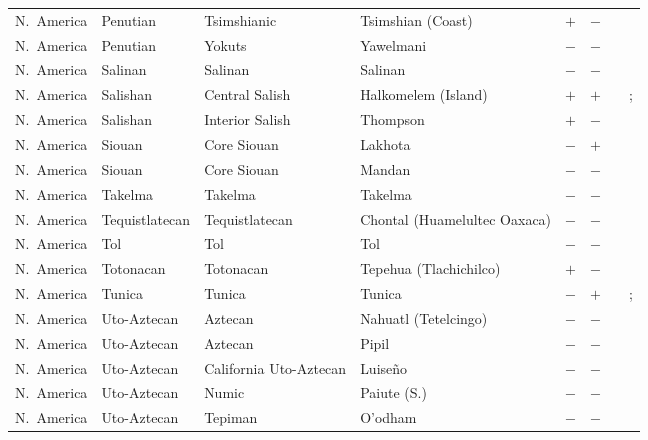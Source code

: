 \begin{landscape}
\begin{longtable}{l>{\raggedright\arraybackslash}p{2.2cm}>{\raggedright}p{2.5cm}>{\raggedright\arraybackslash}p{2.5cm}cc>{\raggedright\arraybackslash}p{3.4cm}>{\raggedright\arraybackslash}p{3.4cm}}
N.~America & Penutian & Tsimshianic & Tsimshian (Coast) & $+$ & $-$ & \citealt{Gil2013} & \citealt{Corbett2013}\\
N.~America & Penutian & Yokuts & Yawelmani & $-$ & $-$ & \citealt{Gil2013} & \citealt[299]{Nichols1992}\\
N.~America & Salinan & Salinan & Salinan & $-$ & $-$ & \citealt{Gil2013} & \citealt[299]{Nichols1992}\\
N.~America & Salishan & Central Salish & Halkomelem (Island) & $+$ & $+$ & \citealt[254--266]{Gerdts2004} & \citealt[417--418]{Gerdts2013}; \citealt[176--177]{Gerdts2010}\\
N.~America & Salishan & Interior Salish & Thompson & $+$ & $-$ & \citealt{Gil2013} & \citealt{Corbett2013}\\
N.~America & Siouan & Core Siouan & Lakhota & $-$ & $+$ & \citealt{Gil2013} & \citealt[36--37]{Valin1977}\\
N.~America & Siouan & Core Siouan & Mandan & $-$ & $-$ & \citealt{Gil2013} & \citealt[passim]{Kennard1936}\\
N.~America & Takelma & Takelma & Takelma & $-$ & $-$ & \citealt{Gil2013} & \citealt[299]{Nichols1992}\\
N.~America & Tequistlatecan & Tequistlatecan & Chontal (Huamelultec Oaxaca) & $-$ & $-$ & \citealt[301]{Nichols1992} & \citealt[356--358]{Waterhouse1967}\\
N.~America & Tol & Tol & Tol & $-$ & $-$ & \citealt{Gil2013} & \citealt{Corbett2013}\\
N.~America & Totonacan & Totonacan & Tepehua (Tlachichilco) & $+$ & $-$ & \citealt[301]{Nichols1992} & \citealt[301]{Nichols1992}\\
N.~America & Tunica & Tunica & Tunica & $-$ & $+$ & \citealt{Gil2013} & \citealt{Corbett2013}; \citealt[36--38, 62, 64--65, 102--110]{Haas1940}\\
N.~America & Uto-Aztecan & Aztecan & Nahuatl (Tetelcingo) & $-$ & $-$ & \citealt{Gil2013} & \citealt{Corbett2013}\\
N.~America & Uto-Aztecan & Aztecan & Pipil & $-$ & $-$ & \citealt{Gil2013} & \citealt{Corbett2013}\\
N.~America & Uto-Aztecan & California Uto-Aztecan & Luiseño & $-$ & $-$ & \citealt{Gil2013} & \citealt[23--28]{Elliott1999}\\
N.~America & Uto-Aztecan & Numic & Paiute (S.) & $-$ & $-$ & \citealt{Gil2013} & \citealt[299]{Nichols1992}\\
N.~America & Uto-Aztecan & Tepiman & O'odham & $-$ & $-$ & \citealt{Gil2013} & \citealt[299]{Nichols1992}\\

\end{longtable}
\end{landscape}

